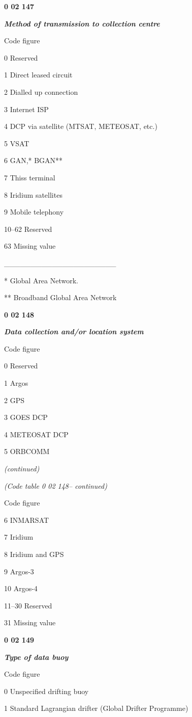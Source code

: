 \textbf{0 02 147}

\emph{\textbf{Method of transmission to collection centre}}

Code figure

0 Reserved

1 Direct leased circuit

2 Dialled up connection

3 Internet ISP

4 DCP via satellite (MTSAT, METEOSAT, etc.)

5 VSAT

6 GAN,* BGAN**

7 Thiss terminal

8 Iridium satellites

9 Mobile telephony

10--62 Reserved

63 Missing value

\_\_\_\_\_\_\_\_\_\_\_\_\_\_\_\_\_\_\_\_\_

* Global Area Network.

** Broadband Global Area Network

\textbf{0 02 148}

\emph{\textbf{Data collection and/or location system}}

Code figure

0 Reserved

1 Argos

2 GPS

3 GOES DCP

4 METEOSAT DCP

5 ORBCOMM

\emph{(continued)}

\emph{(Code table 0 02 148-- continued)}

Code figure

6 INMARSAT

7 Iridium

8 Iridium and GPS

9 Argos-3

10 Argos-4

11--30 Reserved

31 Missing value

\textbf{0 02 149}

\emph{\textbf{Type of data buoy}}

Code figure

0 Unspecified drifting buoy

1 Standard Lagrangian drifter (Global Drifter Programme)

